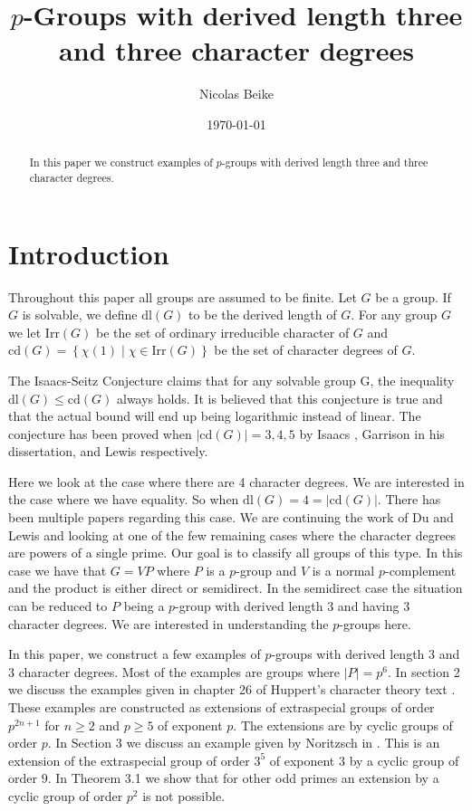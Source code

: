 \documentclass[]{amsart}
\title{$p$-Groups with derived length three and three character degrees}
\author[N. Beike]{Nicolas Beike}
\date{\today}
\theoremstyle{definition}
\theoremstyle{definition}
\theoremstyle{definition}
\theoremstyle{definition}
\theoremstyle{remark}
\theoremstyle{remark}
\newcommand{\abs}[1]{\left\lvert{#1}\right\rvert}
\newcommand{\set}[1]{\left\{{#1}\right\}}
\begin{document}
    \begin{abstract}
        In this paper we construct examples of $p$-groups with derived length three and three character degrees.
    \end{abstract} 

    \maketitle

    \section{Introduction}

          Throughout this paper all groups are assumed to be finite. Let $G$ be a group. If $G$ is solvable, we define $\mathrm{dl}(G)$ to be the derived length of $G$. For any group $G$ we let $\mathrm{Irr}(G)$ be the set of ordinary irreducible character of $G$ and $\mathrm{cd}(G)=\set{\chi(1) \mid \chi\in \mathrm{Irr}(G)}$ be the set of character degrees of $G$.

          The Isaacs-Seitz Conjecture claims that for any solvable group G, the inequality $\mathrm{dl}(G)\leq {\mathrm{cd}(G)}$ always holds. It is believed that this conjecture is true and that the actual bound will end up being logarithmic instead of linear. The conjecture has been proved when $\abs{\mathrm{cd}(G)}=3,4,5$ by Isaacs \cite{Isa}, Garrison \cite{Gar} in his dissertation, and Lewis \cite{Lew} respectively. 
    
          Here we look at the case where there are 4 character degrees. We are interested in the case where we have equality. So when $\mathrm{dl}(G)=4=\abs{\mathrm{cd}(G)}$. There has been multiple papers regarding this case. We are continuing the work of Du and Lewis \cite{DuLew} and looking at one of the few remaining cases where the character degrees are powers of a single prime. Our goal is to classify all groups of this type. In this case we have that $G=V P$ where $P$ is a $p$-group and $V$ is a normal $p$-complement and the product is either direct or semidirect. In the semidirect case the situation can be reduced to $P$ being a $p$-group with derived length 3 and having 3 character degrees. We are interested in understanding the $p$-groups here. 

          In this paper, we construct a few examples of $p$-groups with derived length 3 and 3 character degrees. Most of the examples are groups where $\abs{P}=p^6$. In section 2 we discuss the examples given in chapter 26 of Huppert's character theory text \cite{Hup}. These examples are constructed as extensions of extraspecial groups of order $p^{2n+1}$ for $n\geq 2$ and $p\geq 5$ of exponent $p$. The extensions are by cyclic groups of order $p$. In Section 3 we discuss an example given by Noritzsch in \cite{Nor}. This is an extension of the extraspecial group of order $3^5$ of exponent $3$ by a cyclic group of order $9$. In Theorem 3.1 we show that for other odd primes an extension by a cyclic group of order $p^2$ is not possible. 
          
\end{document}
